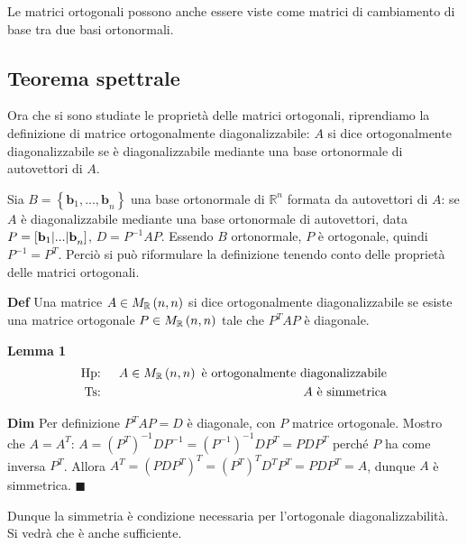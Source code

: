\documentclass{article}
\begin{document}
Le matrici ortogonali possono anche essere viste come matrici di cambiamento
di base tra due basi ortonormali.

\subsection{Teorema spettrale}

Ora che si sono studiate le propriet\`{a} delle matrici ortogonali,
riprendiamo la definizione di matrice ortogonalmente diagonalizzabile: $A$
si dice ortogonalmente diagonalizzabile se \`{e} diagonalizzabile mediante
una base ortonormale di autovettori di $A$.

Sia $B=\left\{ \mathbf{b}_{1}\mathbf{,...,b}_{n}\right\} $ una base
ortonormale di $%
\mathbb{R}
^{n}$ formata da autovettori di $A$: se $A$ \`{e} diagonalizzabile mediante
una base ortonormale di autovettori, data $P=\left[ \mathbf{b}_{1}\mathbf{%
|...|b}_{n}\right] $, $D=P^{-1}AP$. Essendo $B$ ortonormale, $P$ \`{e}
ortogonale, quindi $P^{-1}=P^{T}$. Perci\`{o} si pu\`{o} riformulare la
definizione tenendo conto delle propriet\`{a} delle matrici ortogonali.

\textbf{Def} Una matrice $A\in M_{%
\mathbb{R}
}\left( n,n\right) $ si dice ortogonalmente diagonalizzabile se esiste una
matrice ortogonale $P\in M_{%
\mathbb{R}
}\left( n,n\right) $ tale che $P^{T}AP$ \`{e} diagonale.

\textbf{Lemma 1}%
\begin{eqnarray*}
\text{Hp}\text{: } &&A\in M_{%
\mathbb{R}
}\left( n,n\right) \text{ \`{e} ortogonalmente diagonalizzabile} \\
\text{Ts}\text{: } &&A\text{ \`{e} simmetrica}
\end{eqnarray*}

\textbf{Dim} Per definizione $P^{T}AP=D$ \`{e} diagonale, con $P$ matrice
ortogonale. Mostro che $A=A^{T}$: $A=\left( P^{T}\right) ^{-1}DP^{-1}=\left(
P^{-1}\right) ^{-1}DP^{T}=PDP^{T}$ perch\'{e} $P$ ha come inversa $P^{T}$.
Allora $A^{T}=\left( PDP^{T}\right) ^{T}=\left( P^{T}\right)
^{T}D^{T}P^{T}=PDP^{T}=A$, dunque $A$ \`{e} simmetrica. $\blacksquare $

Dunque la simmetria \`{e} condizione necessaria per l'ortogonale
diagonalizzabilit\`{a}. Si vedr\`{a} che \`{e} anche sufficiente.
\end{document}
